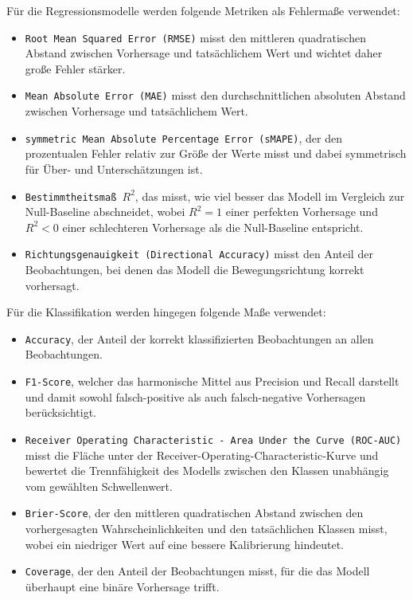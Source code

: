 Für die Regressionsmodelle werden folgende Metriken als Fehlermaße verwendet:
\begin{itemize}
    \item \texttt{Root Mean Squared Error (RMSE)} misst den mittleren quadratischen Abstand zwischen Vorhersage und tatsächlichem Wert und wichtet daher große Fehler stärker. \cite[Kapitel 5.8]{fpp}
    \item \texttt{Mean Absolute Error (MAE)} misst den durchschnittlichen absoluten Abstand zwischen Vorhersage und tatsächlichem Wert. \cite[Kapitel 5.8]{fpp}
    \item \texttt{symmetric Mean Absolute Percentage Error (sMAPE)}, der den prozentualen Fehler relativ zur Größe der Werte misst und dabei symmetrisch für Über- und Unterschätzungen ist. \cite[Kapitel 5.8]{fpp}
    \item \texttt{Bestimmtheitsmaß $R^2$}, das misst, wie viel besser das Modell im Vergleich zur Null-Baseline abschneidet, wobei $R^2 = 1$ einer perfekten Vorhersage und $R^2 < 0$ einer schlechteren Vorhersage als die Null-Baseline entspricht. \cite[Kapitel 7.2]{fpp}
    \item \texttt{Richtungsgenauigkeit (Directional Accuracy)} misst den Anteil der Beobachtungen, bei denen das Modell die Bewegungsrichtung korrekt vorhersagt.
\end{itemize}
Für die Klassifikation werden hingegen folgende Maße verwendet:
\begin{itemize}
    \item \texttt{Accuracy}, der Anteil der korrekt klassifizierten Beobachtungen an allen Beobachtungen.
    \item \texttt{F1-Score}, welcher das harmonische Mittel aus Precision und Recall darstellt und damit sowohl falsch-positive als auch falsch-negative Vorhersagen berücksichtigt. \cite{ismail_paper}
    \item \texttt{Receiver Operating Characteristic - Area Under the Curve (ROC-AUC)} misst die Fläche unter der Receiver-Operating-Characteristic-Kurve und bewertet die Trennfähigkeit des Modells zwischen den Klassen unabhängig vom gewählten Schwellenwert. \cite{ismail_paper}
    \item \texttt{Brier-Score}, der den mittleren quadratischen Abstand zwischen den vorhergesagten Wahrscheinlichkeiten und den tatsächlichen Klassen misst, wobei ein niedriger Wert auf eine bessere Kalibrierung hindeutet.
    \item \texttt{Coverage}, der den Anteil der Beobachtungen misst, für die das Modell überhaupt eine binäre Vorhersage trifft.
\end{itemize}

